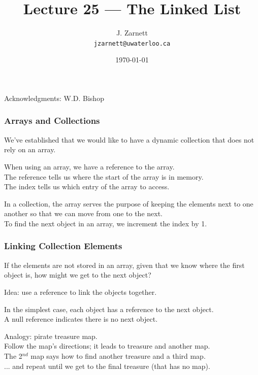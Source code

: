 

\title{Lecture 25 --- The Linked List}

\author{J. Zarnett\\
\texttt{jzarnett@uwaterloo.ca}}
\date{\today}



\begin{frame}
  \titlepage
  
  \begin{center}
  \small{Acknowledgments: W.D. Bishop}
  \end{center}
\end{frame}

\begin{frame}
\frametitle{Arrays and Collections}
We've established that we would like to have a dynamic collection that does not rely on an array.

When using an array, we have a reference to the array.\\
\quad The reference tells us where the start of the array is in memory.\\
\quad The index tells us which entry of the array to access.

In a collection, the array serves the purpose of keeping the elements next to one another so that we can move from one to the next.\\
\quad To find the next object in an array, we increment the index by 1.

\end{frame}

\begin{frame}
\frametitle{Linking Collection Elements}
If the elements are not stored in an array, given that we know where the first object is, how might we get to the next object?

Idea: use a reference to link the objects together.

In the simplest case, each object has a reference to the next object.\\
\quad A null reference indicates there is no next object.

Analogy: pirate treasure map.\\
\quad Follow the map's directions; it leads to treasure and another map.\\
\quad The 2$^{nd}$ map says how to find another treasure and a third map.\\
\quad ... and repeat until we get to the final treasure (that has no map).

\end{frame}

